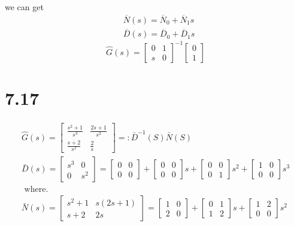 \documentclass{article}
\begin{document}
we can get 
\[
    \begin{split}
    &\overline{N}(s)=\overline{N}_0+\overline{N}_1s\\
    &\overline{D}(s)=\overline{D}_0+\overline{D}_1s
    \end{split}
\]
\[
\hat{G}(s)=
\left[
    \begin{array}{cc}
        0 & 1\\
        s & 0
    \end{array}
\right]^{-1}
\left[
    \begin{array}{c}
        0\\
        1
    \end{array}
\right]   
\]


\section*{7.17}
\[
\begin{array}{l}
 \hat{G}(s)=\left[\begin{array}{cc}
    \frac{s^{2}+1}{s^{3}} & \frac{2 s+1}{s^{2}} \\
    \frac{s+2}{s^{2}} & \frac{2}{s}
    \end{array}\right]=: \bar{D}^{-1}(S) \bar{N}(S) \\
    \bar{D}(s)=\left[\begin{array}{cc}
    s^{3} & 0 \\
    0 & s^{2}
    \end{array}\right]=\left[\begin{array}{cc}
    0 & 0 \\
    0 & 0
    \end{array}\right]+\left[\begin{array}{cc}
    0 & 0 \\
    0 & 0
    \end{array}\right] s+\left[\begin{array}{cc}
    0 & 0 \\
    0 & 1
    \end{array}\right] s^{2}+\left[\begin{array}{cc}
    1 & 0 \\
    0 & 0
    \end{array}\right] s^{3} \\
    \text { where. } \\
    \bar{N}(s)=\left[\begin{array}{cc}
    s^{2}+1 & s(2 s+1) \\
    s+2 & 2 s
    \end{array}\right]=\left[\begin{array}{cc}
    1 & 0 \\
    2 & 0
    \end{array}\right]+\left[\begin{array}{cc}
    0 & 1 \\
    1 & 2
    \end{array}\right] s+\left[\begin{array}{cc}
    1 & 2 \\
    0 & 0
    \end{array}\right] s^{2}
    \end{array}
\]
\end{document}
